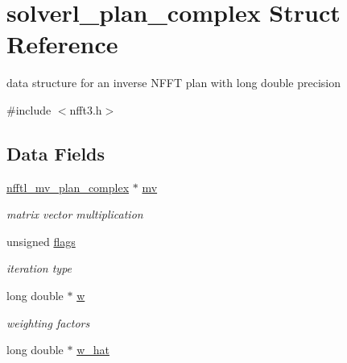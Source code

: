 \hypertarget{structsolverl__plan__complex}{\section{solverl\-\_\-plan\-\_\-complex Struct Reference}
\label{structsolverl__plan__complex}
}


data structure for an inverse N\-F\-F\-T plan with long double precision  




{\ttfamily \#include $<$nfft3.\-h$>$}

\subsection*{Data Fields}
\begin{DoxyCompactItemize}
\item 
\hypertarget{structsolverl__plan__complex_a3da97d0d8d896d9da6a95a68a6f65442}{\hyperlink{structnfftl__mv__plan__complex}{nfftl\-\_\-mv\-\_\-plan\-\_\-complex} $\ast$ \hyperlink{structsolverl__plan__complex_a3da97d0d8d896d9da6a95a68a6f65442}{mv}}\label{structsolverl__plan__complex_a3da97d0d8d896d9da6a95a68a6f65442}

\begin{DoxyCompactList}\small\item\em matrix vector multiplication \end{DoxyCompactList}\item 
\hypertarget{structsolverl__plan__complex_abd86575c07d53042297da1c54ebc9e1a}{unsigned \hyperlink{structsolverl__plan__complex_abd86575c07d53042297da1c54ebc9e1a}{flags}}\label{structsolverl__plan__complex_abd86575c07d53042297da1c54ebc9e1a}

\begin{DoxyCompactList}\small\item\em iteration type \end{DoxyCompactList}\item 
\hypertarget{structsolverl__plan__complex_a547382238a57e96f316bac4dd291af0d}{long double $\ast$ \hyperlink{structsolverl__plan__complex_a547382238a57e96f316bac4dd291af0d}{w}}\label{structsolverl__plan__complex_a547382238a57e96f316bac4dd291af0d}

\begin{DoxyCompactList}\small\item\em weighting factors \end{DoxyCompactList}\item 
\hypertarget{structsolverl__plan__complex_ad4d107f6ef642a2f8173d05d73bde405}{long double $\ast$ \hyperlink{structsolverl__plan__complex_ad4d107f6ef642a2f8173d05d73bde405}{w\-\_\-hat}}\label{structsolverl__plan__complex_ad4d107f6ef642a2f8173d05d73bde405}


\end{DoxyCompactItemize}
